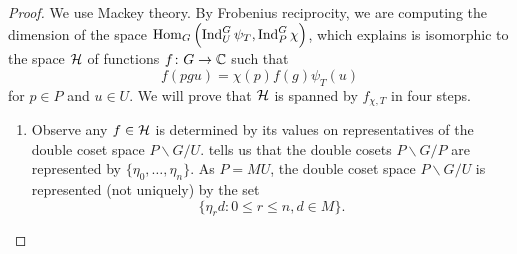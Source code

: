 \begin{proof}
	We use Mackey theory. By Frobenius reciprocity, we are computing the dimension of the space $\operatorname{Hom}_G\left(\operatorname{Ind}_U^G\psi_T,\operatorname{Ind}_P^G\chi\right)$, which \cite[Theorem~32.1]{bump-lie-group} explains is isomorphic to the space $\mathcal{H}$ of functions $f\colon G\to\mathbb C$ such that
    \[f(pgu)=\chi(p)f(g)\psi_T(u)\]
    for $p\in P$ and $u\in U$. We will prove that $\mathcal{H}$ is spanned by $f_{\chi, T}$ in four steps.
	\begin{enumerate}
		\item Observe any $f \in \mathcal{H}$ is determined by its values on representatives of the double coset space $P\backslash G/U$.  tells us that the double cosets $P\backslash G/P$ are represented by $\{\eta_0,\ldots,\eta_n\}$. As $P=MU$, the double coset space $P\backslash G/U$ is represented (not uniquely) by the set
        \[\{\eta_rd:0\le r\le n,d\in M\}.\]

\end{enumerate}
\end{proof}
